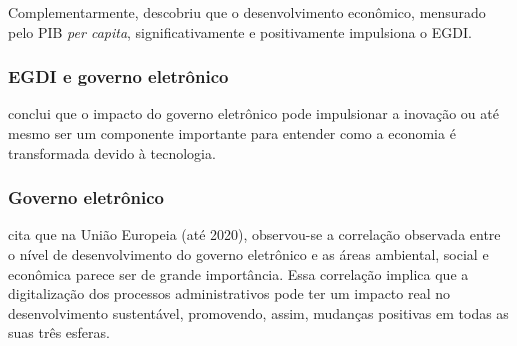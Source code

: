 Complementarmente, \cite{kumar2020cultural} descobriu que o desenvolvimento econômico, mensurado pelo PIB \textit{per capita}, significativamente e positivamente impulsiona o EGDI. 

\subsubsection{EGDI e governo eletrônico}

\cite{kotenok2020government} conclui que o impacto do governo eletrônico pode impulsionar a inovação ou até mesmo ser um componente importante para entender como a economia é transformada devido à tecnologia. 

\subsubsection{Governo eletrônico}

\cite{ziolo2022government} cita que na União Europeia (até 2020), observou-se a correlação observada entre o nível de desenvolvimento do governo eletrônico e as áreas ambiental, social e econômica parece ser de grande importância. Essa correlação implica que a digitalização dos processos administrativos pode ter um impacto real no desenvolvimento sustentável, promovendo, assim, mudanças positivas em todas as suas três esferas.
